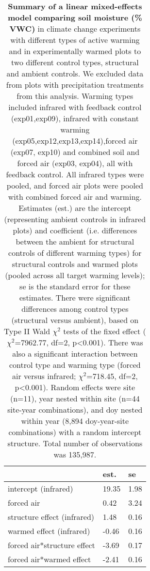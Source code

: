 \documentclass{article}
\begin{document}
\begin{table}[ht]
\centering
\caption{\textbf{Summary of a linear mixed-effects model comparing soil moisture (\% VWC)} in climate change experiments with different types of active warming and in experimentally warmed plots to two different control types, structural and ambient controls. We excluded data from plots with precipitation treatments from this analysis. Warming types included infrared with feedback control (exp01,exp09), infrared with constant warming (exp05,exp12,exp13,exp14),forced air (exp07, exp10) and combined soil and forced air (exp03, exp04), all with feedback control.  All infrared types were pooled, and forced air plots were pooled with combined forced air and warming.  Estimates (est.) are the intercept (representing ambient controls in infrared plots) and coefficient (i.e. differences between the ambient for structural controls of different warming types) for structural controls and warmed plots (pooled across all target warming levels); se is the standard error for these estimates. There were significant differences among control types (structural versus ambient), based on Type II Wald $\chi^{2}$ tests of the fixed effect ($\chi^{2}$=7962.77, df=2, p<0.001). There was also a significant interaction between control type and warming type (forced air versus infrared; $\chi^{2}$=718.45, df=2, p<0.001). Random effects were site (n=11), year nested within site (n=44 site-year combinations), and doy nested within year (8,894 doy-year-site combinations) with a random intercept structure. Total number of observations was 135,987.} 
\label{table:warmsoilmois}
\begingroup\footnotesize
\begin{tabular}{|p{}|p{}p{}|}
  \hline
 & est. & se \\ 
  \hline
intercept (infrared) & 19.35 & 1.98 \\ 
  forced air & 0.42 & 3.24 \\ 
  structure effect (infrared) & 1.48 & 0.16 \\ 
  warmed effect (infrared) & -0.46 & 0.16 \\ 
  forced air*structure effect & -3.69 & 0.17 \\ 
  forced air*warmed effect & -2.41 & 0.16 \\ 
   \hline
\end{tabular}
\endgroup
\end{table}%
\end{document}

